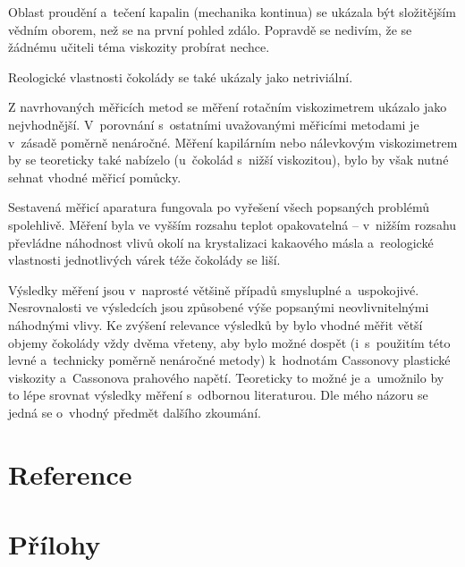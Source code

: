 \documentclass[12pt]{article}
\begin{document}
Oblast proudění a~tečení kapalin (mechanika kontinua) se ukázala být složitějším vědním oborem, než se na první pohled zdálo. Popravdě se nedivím, že se žádnému učiteli téma viskozity probírat nechce.
\par\noindent
Reologické vlastnosti čokolády se také ukázaly jako netriviální.
\par\noindent
Z navrhovaných měřicích metod se měření rotačním viskozimetrem ukázalo jako nejvhodnější. V~porovnání s~ostatními uvažovanými měřicími metodami je v~zásadě poměrně nenáročné. Měření kapilárním nebo nálevkovým viskozimetrem by se teoreticky také nabízelo (u~čokolád s~nižší viskozitou), bylo by však nutné sehnat vhodné měřicí pomůcky.
\par\noindent
Sestavená měřicí aparatura fungovala po vyřešení všech popsaných problémů spolehlivě. Měření byla ve vyšším rozsahu teplot opakovatelná -- v~nižším rozsahu převládne náhodnost vlivů okolí na krystalizaci kakaového másla a~reologické vlastnosti jednotlivých várek téže čokolády se liší.
\par\noindent
Výsledky měření jsou v~naprosté většině případů smysluplné a~uspokojivé. Nesrovnalosti ve výsledcích jsou způsobené výše popsanými neovlivnitelnými náhodnými vlivy. Ke zvýšení relevance výsledků by bylo vhodné měřit větší objemy čokolády vždy dvěma vřeteny, aby bylo možné dospět (i~s~použitím této levné a~technicky poměrně nenáročné metody) k~hodnotám Cassonovy plastické viskozity a~Cassonova prahového napětí. Teoreticky to možné je a~umožnilo by to lépe srovnat výsledky měření s~odbornou literaturou. Dle mého názoru se jedná se o~vhodný předmět dalšího zkoumání.

\newpage%
\section*{Reference}%

\printbibliography[heading=none]

\newpage%
\pagestyle{empty}%
\section*{Přílohy}%
\end{document}
